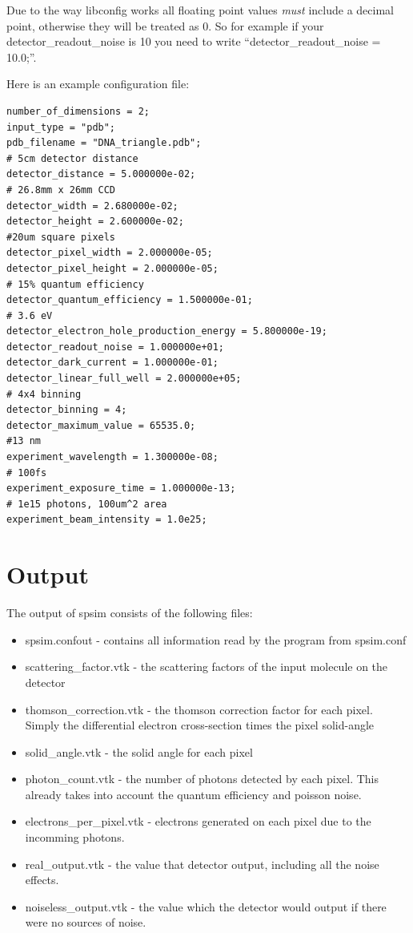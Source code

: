 \documentclass{report}
\begin{document}
Due to the way libconfig works all floating point values {\em must} include 
a decimal point, otherwise they will be treated as 0. So for example
if your detector\_readout\_noise is 10 you need to write ``detector\_readout\_noise = 10.0;''.

Here is an example configuration file:

\begin{verbatim}
number_of_dimensions = 2;
input_type = "pdb";
pdb_filename = "DNA_triangle.pdb";
# 5cm detector distance
detector_distance = 5.000000e-02;
# 26.8mm x 26mm CCD
detector_width = 2.680000e-02;
detector_height = 2.600000e-02;
#20um square pixels 
detector_pixel_width = 2.000000e-05;
detector_pixel_height = 2.000000e-05;
# 15% quantum efficiency 
detector_quantum_efficiency = 1.500000e-01;
# 3.6 eV
detector_electron_hole_production_energy = 5.800000e-19;
detector_readout_noise = 1.000000e+01;
detector_dark_current = 1.000000e-01;
detector_linear_full_well = 2.000000e+05;
# 4x4 binning
detector_binning = 4;
detector_maximum_value = 65535.0;
#13 nm
experiment_wavelength = 1.300000e-08;
# 100fs
experiment_exposure_time = 1.000000e-13;
# 1e15 photons, 100um^2 area
experiment_beam_intensity = 1.0e25;
\end{verbatim}

\section{Output}
The output of spsim consists of the following files:

\begin{itemize}
\item spsim.confout - contains all information read by the program from spsim.conf
\item scattering\_factor.vtk - the scattering factors of the input molecule on the detector
\item thomson\_correction.vtk - the thomson correction factor for each pixel. Simply the differential electron cross-section times the pixel solid-angle
\item solid\_angle.vtk - the solid angle for each pixel
\item photon\_count.vtk - the number of photons detected by each pixel. This already takes into account the quantum efficiency and poisson noise.
\item electrons\_per\_pixel.vtk - electrons generated on each pixel due to the incomming photons.
\item real\_output.vtk - the value that detector output, including all the noise effects.
\item noiseless\_output.vtk - the value which the detector would output if there were no sources of noise.
\end{itemize}
\end{document}
